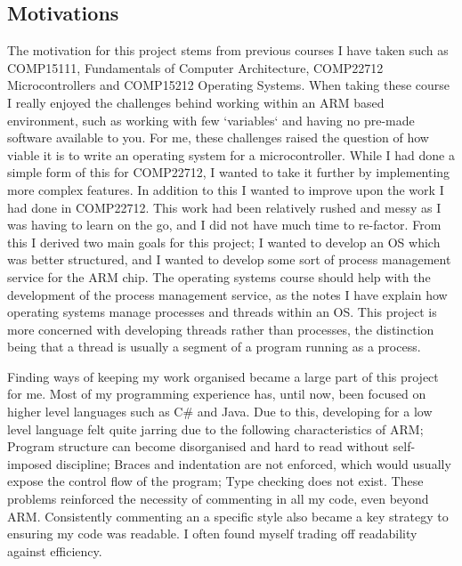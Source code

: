 \label{motivations}
\subsection{Motivations}
The motivation for this project stems from previous courses I have taken such as COMP15111, Fundamentals of Computer Architecture, COMP22712 Microcontrollers and COMP15212 Operating Systems. When taking these course I really enjoyed the challenges behind working within an ARM based environment, such as working with few `variables` and having no pre-made software available to you. For me, these challenges raised the question of how viable it is to write an operating system for a microcontroller.
While I had done a simple form of this for COMP22712, I wanted to take it further by implementing more complex features. In addition to this I wanted to improve upon the work I had done in COMP22712. This work had been relatively rushed and messy as I was having to learn on the go, and I did not have much time to re-factor. From this I derived two main goals for this project; I wanted to develop an OS which was better structured, and I wanted to develop some sort of process management service for the ARM chip. The operating systems course should help with the development of the process management service, as the notes I have explain how operating systems manage processes and threads within an OS. This project is more concerned with developing threads rather than processes, the distinction being that a thread is usually a segment of a program running as a process. 

Finding ways of keeping my work organised became a large part of this project for me. Most of my programming experience has, until now, been focused on higher level languages such as C\# and Java. Due to this, developing for a low level language felt quite jarring due to the following characteristics of ARM; Program structure can become disorganised and hard to read without self-imposed discipline; Braces and indentation are not enforced, which would usually expose the control flow of the program; Type checking does not exist. These problems reinforced the necessity of commenting in all my code, even beyond ARM. Consistently commenting an a specific style also became a key strategy to ensuring my code was readable. I often found myself trading off readability against efficiency.

